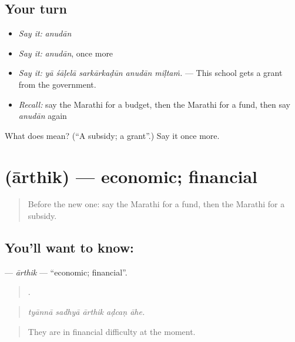 \subsection*{Your turn}
\begin{itemize}
\raggedright
  \item \emph{Say it:} \emph{anudān}
  \item \emph{Say it:} \emph{anudān}, once more
  \item \emph{Say it:} \emph{yā śāḷelā sarkārkaḍūn anudān miḷtaṁ.} — This school gets a grant from the government.
  \item \emph{Recall:} say the Marathi for a budget, then the Marathi for a fund, then say \emph{anudān} again
\end{itemize}

\begin{tcolorbox}[breakable,colback=teal!4,colframe=teal!35!black,title={Before you move on}]
What does  mean? (\textquotedblleft{}A subsidy; a grant\textquotedblright{}.) Say it once more.
\end{tcolorbox}
\section[\texorpdfstring{\mr{आर्थिक} (ārthik)}{आर्थिक (ārthik)}]{ (ārthik) — economic; financial}

\label{lesson:MR-C361-arthik}



\begin{quote}
Before the new one: say the Marathi for a fund, then the Marathi for a subsidy.
\end{quote}

\subsection*{You'll want to know: }
\textbf{} — \emph{ārthik} — \textquotedblleft{}economic; financial\textquotedblright{}.

\begin{quote}
    .
\end{quote}

\begin{quote}
\emph{tyānnā sadhyā ārthik aḍcaṇ āhe.}
\end{quote}

\begin{quote}
They are in financial difficulty at the moment.
\end{quote}

